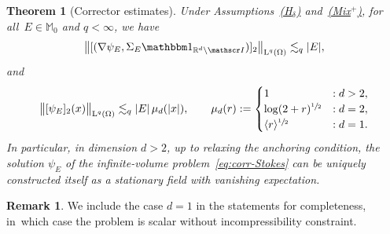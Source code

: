 \documentclass[JEP,XML,SOM,Unicode,published]{cedram}
\let\mathcal\mathscr
\newcommand{\Hd}{\hyperref[Hd]{\textup{(H$_\delta$)}}\xspace}
\newcommand{\Mix}{\hyperref[Mix+]{\textup{(Mix$^+$)}}\xspace}
\let\mathds\mathbbm
\theoremstyle{plain}
\newtheorem{theor1}{Theorem}
\theoremstyle{definition}
\newtheorem{rem}[theor]{Remark}
\newcommand{\R}{\mathbb R}
\newcommand{\Ic}{\mathcal I}
\newcommand{\Md}{\mathbb M}
\newcommand{\Ld}{\operatorname{L}}
\begin{document}
\begin{theor1}[Corrector estimates]\label{th:cor}
Under Assumptions~\Hd and~\Mix, for all~$E\in\Md_0$ and $q<\infty$, we have
\begin{equation*}\label{eq:bnd-grad-cor}
\bigl\|[(\nabla\psi_E,\Sigma_E\mathds1_{\R^d\setminus\Ic})]_2\bigr\|_{\Ld^q(\Omega)}\lesssim_q |E|,
\end{equation*}
and
\begin{equation}\label{eq:bnd-cor}
\bigl\|[\psi_E]_2(x)\bigr\|_{\Ld^q(\Omega)}\lesssim_q |E|\,\mu_d(|x|),\qquad\mu_d(r):=\begin{cases}
1&:d>2,\\
\log(2+r)^{\sfrac12}&:d=2,\\
\langle r\rangle^{\sfrac12}&:d=1.
\end{cases}
\end{equation}
In particular, in dimension $d>2$, up to relaxing the anchoring condition, the solution $\psi_E$ of the infinite-volume problem~\eqref{eq:corr-Stokes} can be uniquely constructed itself as a stationary field with vanishing expectation.
\end{theor1}
\begin{rem}
We include the case $d=1$ in the statements for completeness, in~which case the problem is scalar without incompressibility constraint.
\end{rem}
\end{document}
